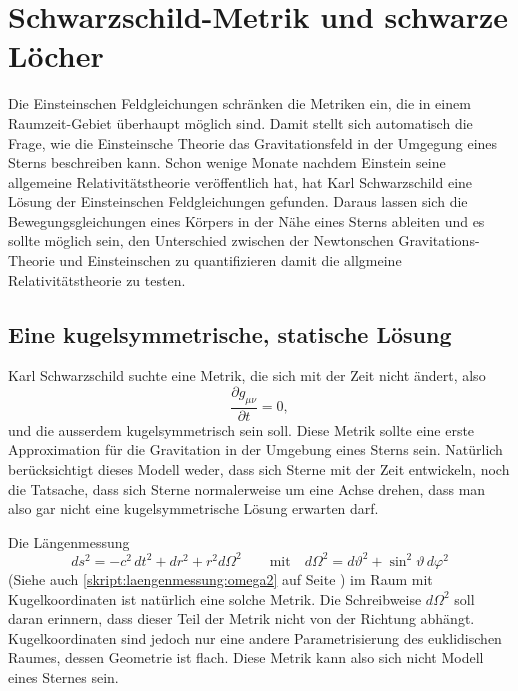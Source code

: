 %
%
%
\chapter{Schwarzschild-Metrik und schwarze Löcher%
\label{skript:chapter:schwarzschild}}
\rhead{}
Die Einsteinschen Feldgleichungen schränken die Metriken ein,
die in einem Raumzeit-Gebiet über\-haupt möglich sind.
Damit stellt sich automatisch die Frage, wie die Einsteinsche Theorie 
das Gravitationsfeld in der Umgegung eines Sterns beschreiben kann.
Schon wenige Monate nachdem Einstein seine allgemeine Relativitätstheorie
veröffentlich hat, hat Karl Schwarzschild eine Lösung der Einsteinschen
Feldgleichungen gefunden.
Daraus lassen sich die Bewegungsgleichungen eines Körpers in der Nähe
eines Sterns ableiten und es sollte möglich sein, den Unterschied zwischen
der Newtonschen Gravitations-Theorie und Einsteinschen  zu quantifizieren
damit die allgmeine Relativitätstheorie zu testen.

\section{Eine kugelsymmetrische, statische Lösung}
\label{skript:schwarzschild:kugelsymmetrischeloesung}
Karl Schwarzschild suchte eine Metrik, die sich mit der Zeit nicht ändert,
also
\[
\frac{\partial g_{\mu\nu}}{\partial t}=0,
\]
und die ausserdem kugelsymmetrisch sein soll.
Diese Metrik sollte eine erste Approximation für die Gravitation in
der Umgebung eines Sterns sein.
Natürlich berücksichtigt dieses Modell weder, dass sich Sterne mit
der Zeit entwickeln, noch die Tatsache, dass sich Sterne normalerweise
um eine Achse drehen, dass man also gar nicht eine kugelsymmetrische
Lösung erwarten darf.

Die Längenmessung
\begin{equation}
ds^2
=
-c^2\,dt^2 + dr^2 + r^2 d\Omega^2
\qquad
\text{mit}
\quad
d\Omega^2 = d\vartheta^2 + \sin^2\vartheta\,d\varphi^2
\label{skript:kruemmung:euklid}
\end{equation}
(Siehe auch \eqref{skript:laengenmessung:omega2} auf Seite
\pageref{skript:laengenmessung:omega2})
im Raum mit Kugelkoordinaten ist natürlich eine solche Metrik.
Die Schreibweise $d\Omega^2$ soll daran erinnern, dass dieser Teil der
Metrik nicht von der Richtung abhängt.
Kugelkoordinaten sind jedoch nur eine andere Parametrisierung des euklidischen
Raumes, dessen Geometrie ist flach.
Diese Metrik kann also sich nicht Modell eines Sternes sein.

